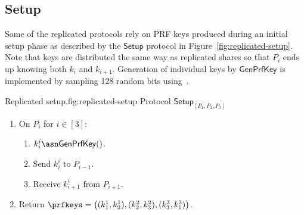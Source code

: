 \subsection{Setup}

Some of the replicated protocols rely on PRF keys produced during an initial setup phase as described by the $\mathsf{Setup}$ protocol in Figure~\ref{fig:replicated-setup}. Note that keys are distributed the same way as replicated shares so that $P_i$ ends up knowing both $k_i$ and $k_{i+1}$. Generation of individual keys by $\mathsf{GenPrfKey}$ is implemented by sampling 128 random bits using~\cite{libsodium}.

\begin{Boxfig}{Replicated setup.}{fig:replicated-setup}
  {Protocol $\mathsf{Setup}_{[P_1, P_2, P_3]}$}
  
  \begin{enumerate}
  \item On $P_i$ for $i \in [3]$:
  \begin{enumerate}
    \item $k^{i}_{i} \asn \mathsf{GenPrfKey}()$.
    \item Send $k^{i}_{i}$ to $P_{i-1}$.
    \item Receive $k^{i}_{i+1}$ from $P_{i+1}$.
  \end{enumerate}
  
  \item Return $\prfkeys = \left( (k^1_1, k^1_2), (k^2_2, k^2_3), (k^3_3, k^3_1) \right)$.
  \end{enumerate}
\end{Boxfig}

